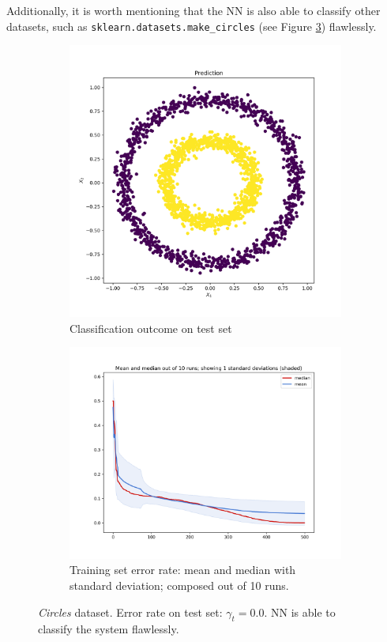 \documentclass[12pt]{article}
\begin{document}
\newpage
\noindent Additionally, it is worth mentioning that the NN is also able to classify other datasets, such as \texttt{sklearn.datasets.make\_circles} (see Figure \ref{fig:circ}) flawlessly.
\begin{figure}[h!]
\captionsetup[subfigure]{labelformat=empty}
\centering
	\begin{subfigure}{.48\textwidth}
	\centering
	\includegraphics[scale=0.40]{pics/Prediction}
	\caption{Classification outcome on test set}
	\label{fig:v_a}
	\end{subfigure}
	\begin{subfigure}{.48\textwidth}
	\centering
	\includegraphics[scale=0.40]{pics/circle_ens_iii}
	\caption{Training set error rate: mean and median with standard deviation; composed out of 10 runs.}
	\label{fig:v_b}
	\end{subfigure}
\caption{\textsl{Circles} dataset. Error rate on test set: $\gamma_t = 0.0$. NN is able to classify the system flawlessly.}
\label{fig:circ}
\end{figure}
\end{document}
